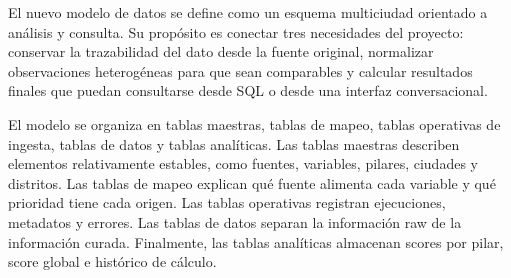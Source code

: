 El nuevo modelo de datos se define como un esquema multiciudad orientado a análisis y consulta. Su propósito es conectar tres necesidades del proyecto: conservar la trazabilidad del dato desde la fuente original, normalizar observaciones heterogéneas para que sean comparables y calcular resultados finales que puedan consultarse desde SQL o desde una interfaz conversacional.

El modelo se organiza en tablas maestras, tablas de mapeo, tablas operativas de ingesta, tablas de datos y tablas analíticas. Las tablas maestras describen elementos relativamente estables, como fuentes, variables, pilares, ciudades y distritos. Las tablas de mapeo explican qué fuente alimenta cada variable y qué prioridad tiene cada origen. Las tablas operativas registran ejecuciones, metadatos y errores. Las tablas de datos separan la información raw de la información curada. Finalmente, las tablas analíticas almacenan scores por pilar, score global e histórico de cálculo.

